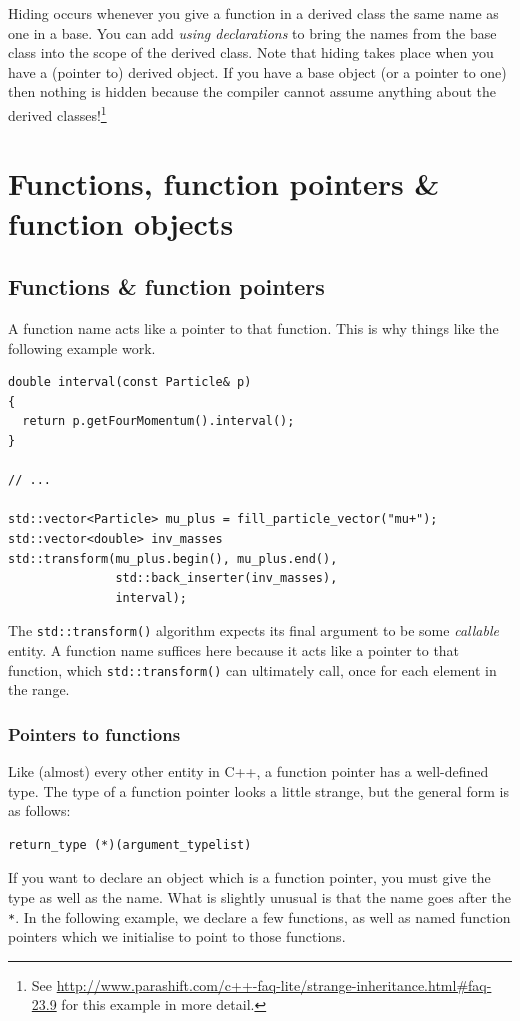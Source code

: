 \documentclass[a4paper]{scrartcl}
\begin{document}
Hiding occurs whenever you give a function in a derived class the same name as one in a base. You can add \emph{using declarations} to bring the names from the base class into the scope of the derived class. Note that hiding takes place when you have a (pointer to) derived object. If you have a base object (or a pointer to one) then nothing is hidden because the compiler cannot assume anything about the derived classes!\footnote{See \url{http://www.parashift.com/c++-faq-lite/strange-inheritance.html\#faq-23.9} for this example in more detail.}

\section{Functions, function pointers \& function objects}
\subsection{Functions \& function pointers}
A function name acts like a pointer to that function. This is why things like the following example work.
\begin{verbatim}
double interval(const Particle& p)
{
  return p.getFourMomentum().interval();
}

// ...

std::vector<Particle> mu_plus = fill_particle_vector("mu+");
std::vector<double> inv_masses
std::transform(mu_plus.begin(), mu_plus.end(),
               std::back_inserter(inv_masses),
               interval);
\end{verbatim}

The \verb|std::transform()| algorithm expects its final argument to be some \emph{callable} entity. A function name suffices here because it acts like a pointer to that function, which \verb|std::transform()| can ultimately call, once for each element in the range.

\subsubsection{Pointers to functions}
Like (almost) every other entity in C++, a function pointer has a well-defined type. The type of a function pointer looks a little strange, but the general form is as follows:
\begin{verbatim}
return_type (*)(argument_typelist)
\end{verbatim}

If you want to declare an object which is a function pointer, you must give the type as well as the name. What is slightly unusual is that the name goes after the \verb|*|. In the following example, we declare a few functions, as well as named function pointers which we initialise to point to those functions.
\end{document}
